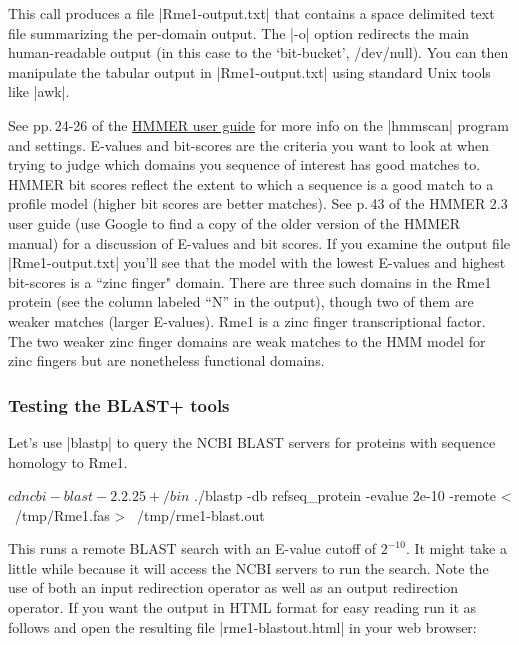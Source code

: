 \documentclass[10pt,letterpaper]{scrartcl}
\begin{document}

This call produces a file |Rme1-output.txt| that contains a space delimited text file summarizing the per-domain output. The |-o| option redirects the main human-readable output (in this case to the `bit-bucket', /dev/null). You can then manipulate the tabular output in |Rme1-output.txt| using standard Unix tools like |awk|. 

See pp.\,24-26  of the \href{ftp://selab.janelia.org/pub/software/hmmer3/3.0/Userguide.pdf}{HMMER user guide} for more info on the |hmmscan| program and settings. E-values and bit-scores are the criteria you want to look at when trying to judge which domains you sequence of interest has good matches to.  HMMER bit scores reflect the extent to which a sequence is a good match to a  profile model (higher bit scores are better matches). See p.\,43 of the HMMER 2.3 user guide (use Google to find a copy of the older version of the HMMER manual) for a discussion of E-values and bit scores.  If you examine the output file |Rme1-output.txt| you'll see that the model with the lowest E-values and highest bit-scores is a ``zinc finger" domain.  There are three such domains in the Rme1 protein (see the column labeled ``N'' in the output), though two of them are weaker matches (larger E-values). Rme1 is a zinc finger transcriptional factor. The two weaker zinc finger domains are weak matches to the HMM model for zinc fingers but are nonetheless functional domains.


\subsubsection*{Testing the BLAST+ tools}

Let's use |blastp| to query the NCBI BLAST servers for proteins with sequence homology to Rme1.


\begin{Code}
$ cd ncbi-blast-2.2.25+/bin
$ ./blastp -db refseq_protein -evalue 2e-10 -remote < ~/tmp/Rme1.fas > ~/tmp/rme1-blast.out
\end{Code}

This runs a remote BLAST search with an E-value cutoff of $2^{-10}$. It might take a little while because it will access the NCBI servers to run the search. Note the use of both an input redirection operator as well as an output redirection operator.  If you want the output in HTML format for easy reading run it as follows and open the resulting file |rme1-blastout.html| in  your web browser:
\end{document}
